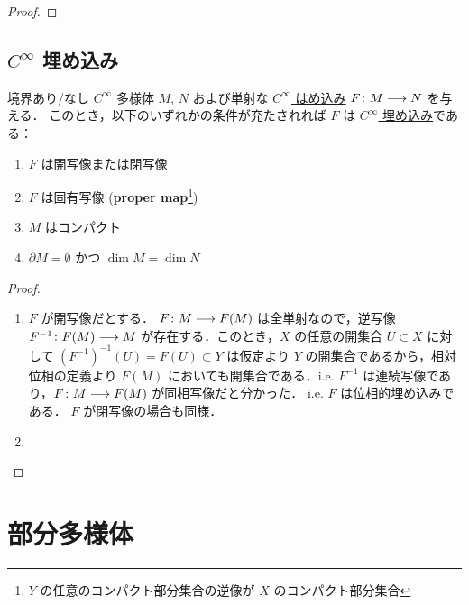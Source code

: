\documentclass[geometry_main]{subfiles}
\begin{document}
\begin{proof}
    
\end{proof}

\subsection{$C^\infty$ 埋め込み}

\begin{myprop}[label=prop:embedding-basic]{}
    境界あり/なし $C^\infty$ 多様体 $M,\, N$ および単射な \hyperref[def:submersion-smooth]{$C^\infty$ はめ込み} $F \colon M \longrightarrow N$ を与える．
    このとき，以下のいずれかの条件が充たされれば $F$ は \hyperref[def:submersion-smooth]{$C^\infty$ 埋め込み}である：
    \begin{enumerate}
        \item $F$ は開写像または閉写像
        \item $F$ は固有写像 (\textbf{proper map}\footnote{$Y$ の任意のコンパクト部分集合の逆像が $X$ のコンパクト部分集合})
        \item $M$ はコンパクト
        \item $\partial M = \emptyset$ かつ $\dim M = \dim N$
    \end{enumerate}
    
\end{myprop}

\begin{proof}
    \begin{enumerate}
        \item $F$ が開写像だとする．
        $F \colon M \longrightarrow F(M)$ は全単射なので，逆写像 $F^{-1} \colon F(M) \longrightarrow M$ が存在する．このとき，$X$ の任意の開集合 $U \subset X$ に対して $(F^{-1})^{-1}(U) = F(U) \subset Y$ は仮定より $Y$ の開集合であるから，相対位相の定義より $F(M)$ においても開集合である．i.e. $F^{-1}$ は連続写像であり，$F \colon M \longrightarrow F(M)$ が同相写像だと分かった．
        i.e. $F$ は位相的埋め込みである．
        $F$ が閉写像の場合も同様．
        \item 
    \end{enumerate}
    
\end{proof}

\section{部分多様体}

	
\end{document}
